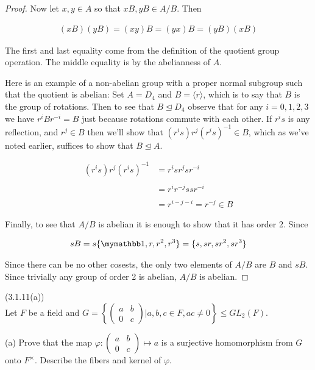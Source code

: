 \documentclass{exam}
\begin{document}
\begin{questions}
\begin{proof}
  Now let $x,y\in A$ so that $xB,yB\in A/B$.  Then

  \begin{align*}
      (xB)(yB) = (xy)B = (yx)B = (yB)(xB)
  \end{align*}

  The first and last equality come from the definition of the quotient group operation.  The middle equality is by the abelianness of $A$.

  \vspace{1cm}

  Here is an example of a non-abelian group with a proper normal subgroup such that the quotient is abelian:  Set $A=D_4$ and $B=\langle r\rangle$, which is to say that $B$ is the group of rotations.  Then to see that $B\trianglelefteq D_4$ observe that for any $i=0,1,2,3$ we have $r^iBr^{-i} = B$ just because rotations commute with each other.  If $r^is$ is any reflection, and $r^j\in B$ then we'll show that $(r^is)r^j(r^is)^{-1}\in B$, which as we've noted earlier, suffices to show that $B\trianglelefteq A$.

  \begin{align*}
    (r^is)r^j(r^is)^{-1} &= r^isr^jsr^{-i} \\\\
    &= r^ir^{-j}ssr^{-i} \\\\
    &= r^{i-j-i} = r^{-j}\in B
  \end{align*}

  Finally, to see that $A/B$ is abelian it is enough to show that it has order 2.  Since

  \begin{align*}
    sB = s\{\mymathbb 1, r, r^2, r^3\} = \{s,sr,sr^2,sr^3\}
  \end{align*}

  Since there can be no other cosests, the only two elements of $A/B$ are $B$ and $sB$.  Since trivially any group of order 2 is abelian, $A/B$ is abelian.


\end{proof}

\question(3.1.11(a))\\
Let $F$ be a field and $G = \left\{\begin{pmatrix}
  a & b \\ 0 & c
\end{pmatrix}| a,b,c\in F, ac\ne 0\right\} \leq GL_2(F)$.

(a) Prove that the map $\varphi:\begin{pmatrix}
  a & b \\ 0 & c
\end{pmatrix} \mapsto a$ is a surjective homomorphism from $G$ onto $F^\times$.  Describe the fibers and kernel of $\varphi$.


\end{questions}
\end{document}
